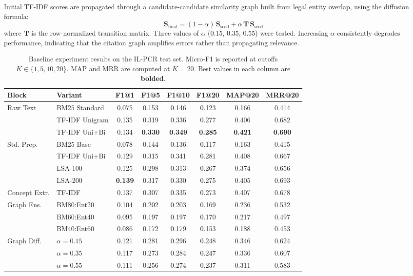 \documentclass[11pt]{article}
\begin{document}
Initial TF-IDF scores are propagated through a candidate-candidate similarity graph built from legal entity overlap, using the diffusion formula:
\begin{equation}
\mathbf{S}_{\text{final}} = (1-\alpha)\,\mathbf{S}_{\text{seed}} + \alpha\,\mathbf{T}\,\mathbf{S}_{\text{seed}}
\end{equation}
where $\mathbf{T}$ is the row-normalized transition matrix.
Three values of $\alpha$ (0.15, 0.35, 0.55) were tested.
Increasing $\alpha$ consistently degrades performance, indicating that the citation graph amplifies errors rather than propagating relevance.

\begin{table}[t]
\centering
\small
\begin{tabular}{@{}llcccccc@{}}
\toprule
\textbf{Block} & \textbf{Variant} & \textbf{F1@1} & \textbf{F1@5} & \textbf{F1@10} & \textbf{F1@20} & \textbf{MAP@20} & \textbf{MRR@20} \\
\midrule
\multirow{3}{*}{Raw Text}
  & BM25 Standard     & 0.075 & 0.153 & 0.146 & 0.123 & 0.166 & 0.414 \\
  & TF-IDF Unigram    & 0.135 & 0.319 & 0.336 & 0.277 & 0.406 & 0.682 \\
  & TF-IDF Uni+Bi     & 0.134 & \textbf{0.330} & \textbf{0.349} & \textbf{0.285} & \textbf{0.421} & \textbf{0.690} \\
\midrule
\multirow{4}{*}{Std. Prep.}
  & BM25 Base          & 0.078 & 0.144 & 0.136 & 0.117 & 0.163 & 0.415 \\
  & TF-IDF Uni+Bi      & 0.129 & 0.315 & 0.341 & 0.281 & 0.408 & 0.667 \\
  & LSA-100            & 0.125 & 0.298 & 0.313 & 0.267 & 0.374 & 0.656 \\
  & LSA-200            & \textbf{0.139} & 0.317 & 0.330 & 0.275 & 0.405 & 0.693 \\
\midrule
Concept Extr. & TF-IDF & 0.137 & 0.307 & 0.335 & 0.273 & 0.407 & 0.678 \\
\midrule
\multirow{3}{*}{Graph Ens.}
  & BM80:Ent20       & 0.104 & 0.202 & 0.203 & 0.169 & 0.236 & 0.532 \\
  & BM60:Ent40       & 0.095 & 0.197 & 0.197 & 0.170 & 0.217 & 0.497 \\
  & BM40:Ent60       & 0.086 & 0.172 & 0.179 & 0.153 & 0.188 & 0.453 \\
\midrule
\multirow{3}{*}{Graph Diff.}
  & $\alpha{=}0.15$  & 0.121 & 0.281 & 0.296 & 0.248 & 0.346 & 0.624 \\
  & $\alpha{=}0.35$  & 0.117 & 0.273 & 0.284 & 0.247 & 0.336 & 0.607 \\
  & $\alpha{=}0.55$  & 0.111 & 0.256 & 0.274 & 0.237 & 0.311 & 0.583 \\
\bottomrule
\end{tabular}
\caption{Baseline experiment results on the IL-PCR test set. Micro-F1 is reported at cutoffs $K \in \{1, 5, 10, 20\}$. MAP and MRR are computed at $K{=}20$. Best values in each column are \textbf{bolded}.}
\label{tab:baselines}
\end{table}
\end{document}
